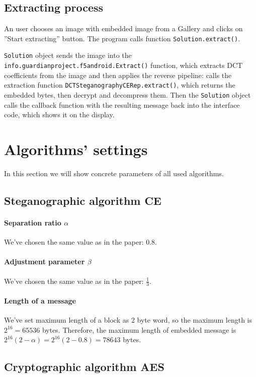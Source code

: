 \subsection{Extracting process}

An user chooses an image with embedded image from a Gallery and clicks on ''Start extracting'' button.
The program calls function \texttt{Solution.extract()}.

\texttt{Solution} object sends the image into the \texttt{info.guardianproject.f5android.Extract()} function,
which extracts DCT coefficients from the image and then applies the reverse pipeline: calls the extraction
function \texttt{DCTSteganographyCERep.extract()}, which returns the embedded bytes, then decrypt
and decompress them. Then the \texttt{Solution} object calls the callback function with the resulting
message back into the interface code, which shows it on the display.

\section{Algorithms' settings}
In this section we will show concrete parameters of all used algorithms.

\subsection{Steganographic algorithm CE}

\paragraph{Separation ratio $\alpha$} We've chosen the same value as in the 
paper: $0.8$.

\paragraph{Adjustment parameter $\beta$} We've chosen the same value as in the paper: $\frac{1}{3}$.

\paragraph{Length of a message}
We've set maximum length of a block as 2 byte word, so the maximum length is 
$2^{16} = 65536$ bytes. Therefore, the maximum length of embedded message is 
$2^{16} (2 - \alpha) = 2^{16} (2 - 0.8) = 78643$ bytes.

\subsection{Cryptographic algorithm AES}

